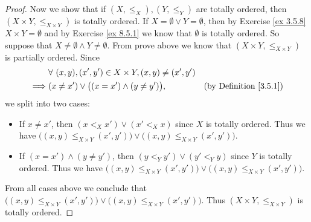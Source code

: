 \begin{proof}
    Now we show that if \((X, \leq_X), (Y, \leq_Y)\) are totally ordered, then \((X \times Y, \leq_{X \times Y})\) is totally ordered.
    If \(X = \emptyset \lor Y = \emptyset\), then by Exercise \ref{ex 3.5.8} \(X \times Y = \emptyset\) and by Exercise \ref{ex 8.5.1} we know that \(\emptyset\) is totally ordered.
    So suppose that \(X \neq \emptyset \land Y \neq \emptyset\).
    From prove above we know that \((X \times Y, \leq_{X \times Y})\) is partially ordered.
    Since
    \begin{align*}
                 & \forall\ (x, y), (x', y') \in X \times Y, (x, y) \neq (x', y')                                      \\
        \implies & (x \neq x') \lor \big((x = x') \land (y \neq y')\big),         & \text{(by Definition \ref{3.5.1})}
    \end{align*}
    we split into two cases:
    \begin{itemize}
        \item If \(x \neq x'\), then \((x <_X x') \lor (x' <_X x)\) since \(X\) is totally ordered.
              Thus we have \(\big((x, y) \leq_{X \times Y} (x', y')\big) \lor \big((x, y) \leq_{X \times Y} (x', y')\big)\).
        \item If \((x = x') \land (y \neq y')\), then \((y <_Y y') \lor (y' <_Y y)\) since \(Y\) is totally ordered.
              Thus we have \(\big((x, y) \leq_{X \times Y} (x', y')\big) \lor \big((x, y) \leq_{X \times Y} (x', y')\big)\).
    \end{itemize}
    From all cases above we conclude that \(\big((x, y) \leq_{X \times Y} (x', y')\big) \lor \big((x, y) \leq_{X \times Y} (x', y')\big)\).
    Thus \((X \times Y, \leq_{X \times Y})\) is totally ordered.


\end{proof}
